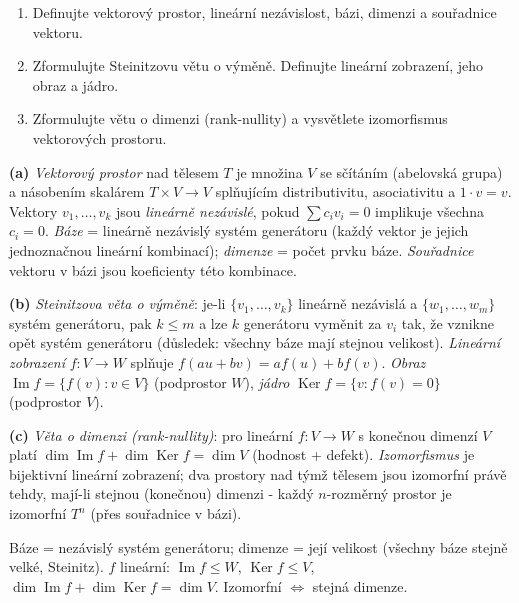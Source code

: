 \begin{zadani}
\begin{enumerate}[label=(\alph*)]
  \item {} Definujte vektorový prostor, lineární nezávislost, bázi, dimenzi a souřadnice vektoru.
  \item {} Zformulujte Steinitzovu větu o výměně. Definujte lineární zobrazení, jeho obraz a jádro.
  \item {} Zformulujte větu o dimenzi (rank-nullity) a vysvětlete izomorfismus vektorových prostoru.
\end{enumerate}
\end{zadani}

\begin{reseni}
\textbf{(a)} \emph{Vektorový prostor} nad tělesem $T$ je množina $V$ se sčítáním (abelovská grupa) a násobením skalárem $T\times V\to V$ splňujícím distributivitu, asociativitu a $1\cdot v=v$. Vektory $v_1,\dots,v_k$ jsou \emph{lineárně nezávislé}, pokud $\sum c_iv_i=0$ implikuje všechna $c_i=0$. \emph{Báze} = lineárně nezávislý systém generátoru (každý vektor je jejich jednoznačnou lineární kombinací); \emph{dimenze} = počet prvku báze. \emph{Souřadnice} vektoru v bázi jsou koeficienty této kombinace.

\textbf{(b)} \emph{Steinitzova věta o výměně}: je-li $\{v_1,\dots,v_k\}$ lineárně nezávislá a $\{w_1,\dots,w_m\}$ systém generátoru, pak $k\le m$ a lze $k$ generátoru vyměnit za $v_i$ tak, že vznikne opět systém generátoru (důsledek: všechny báze mají stejnou velikost). \emph{Lineární zobrazení} $f:V\to W$ splňuje $f(au+bv)=af(u)+bf(v)$. \emph{Obraz} $\operatorname{Im}f=\{f(v):v\in V\}$ (podprostor $W$), \emph{jádro} $\operatorname{Ker}f=\{v:f(v)=0\}$ (podprostor $V$).

\textbf{(c)} \emph{Věta o dimenzi (rank-nullity)}: pro lineární $f:V\to W$ s konečnou dimenzí $V$ platí $\dim\operatorname{Im}f+\dim\operatorname{Ker}f=\dim V$ (hodnost + defekt). \emph{Izomorfismus} je bijektivní lineární zobrazení; dva prostory nad týmž tělesem jsou izomorfní právě tehdy, mají-li stejnou (konečnou) dimenzi - každý $n$-rozměrný prostor je izomorfní $T^n$ (přes souřadnice v bázi).
\end{reseni}

\begin{jadro}
Báze = nezávislý systém generátoru; dimenze = její velikost (všechny báze stejně velké, Steinitz). $f$ lineární: $\operatorname{Im}f\le W$, $\operatorname{Ker}f\le V$, $\dim\operatorname{Im}f+\dim\operatorname{Ker}f=\dim V$. Izomorfní $\iff$ stejná dimenze.
\end{jadro}

